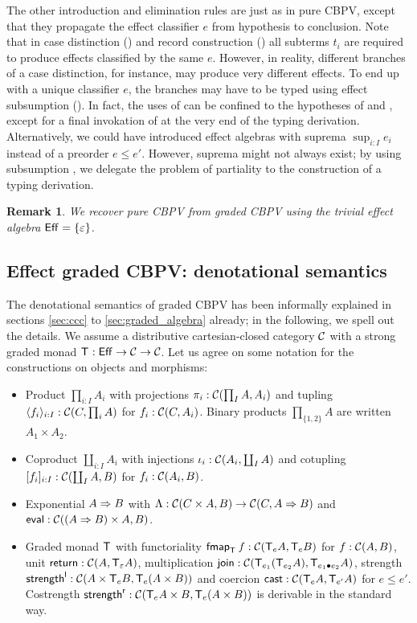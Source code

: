 \documentclass[acmsmall,review,anonymous]{acmart}\settopmatter{printfolios=true,printccs=false,printacmref=false}
\newtheorem{remark}{Remark}
\begin{document}
The other introduction and elimination rules are just as in pure
CBPV, except that they propagate the effect classifier $e$ from
hypothesis to conclusion.  Note that in case distinction (\relim\GS)
and record construction (\rintro\Pi) all subterms $t_i$ are required
to produce effects classified by the same $e$.  However, in reality,
different branches of a case distinction, for instance, may produce
very different effects.  To end up with a unique classifier $e$, the
branches may have to be typed using effect subsumption (\rsub).  In
fact, the uses of \rsub can be confined to the hypotheses of \relim\GS
and \rintro\Pi, except for a final invokation of \rsub at the very end
of the typing derivation.  Alternatively, we could have introduced
effect algebras with suprema $\sup_{i:I} e_i$ instead of a preorder $e
\leq e'$.  However, suprema might not always exist; by using
subsumption \rsub, we delegate the problem of partiality to the
construction of a typing derivation.

\begin{remark}\label{rem:cbpv}
  We recover pure CBPV from graded CBPV using the trivial effect
  algebra $\Eff = \{\Ge\}$.
\end{remark}

\subsection{Effect graded CBPV: denotational semantics}

The denotational semantics of graded CBPV has been informally explained in
sections \ref{sec:ccc} to \ref{sec:graded_algebra} already; in the following,
we spell out the details.  We assume a distributive cartesian-closed
category $\CC$ with a strong graded monad $\T : \Eff \to \CC \to \CC$.
Let us agree on some notation for the constructions on objects and
morphisms:
\begin{itemize}
\item Product $\prod_{i:I} A_i$ with projections $\pi_i : \CC(\prod_I
  A, A_i)$ and tupling $\langle f_i
  \rangle_{i:I} : \CC(C,\prod_i A)$ for $f_i : \CC(C,A_i)$.  Binary
  products $\prod_{\{1,2\}} A$ are written $A_1 \times A_2$.
\item Coproduct $\coprod_{i:I} A_i$ with injections $\iota_i :
  \CC(A_i,\coprod_I A)$ and cotupling $[f_i]_{i:I} : \CC(\coprod_I A,
  B)$ for $f_i : \CC(A_i,B)$.
\item Exponential $A \To B$ with $\Lambda : \CC(C \times A, B) \to
  \CC(C, A \To B)$ and $\teval : \CC((A \To B) \times A, B)$.
\item Graded monad $\T$ with functoriality $\fmap[\T] f :
  \CC(\T[e]A,\T[e]B)$ for $f : \CC(A,B)$,
  unit $\treturn : \CC(A,\T[\Ge]A)$,
  multiplication $\tjoin : \CC(\T[e_1](\T[e_2]A),\T[e_1 \bu e_2]A)$,
  strength $\strengthl : \CC(A \times \T[e]B, \T[e](A \times B))$ and
  coercion $\tcast : \CC(\T[e]A,\T[e']A)$ for $e \leq e'$.
  Costrength $\strengthr : \CC(\T[e]A \times B, \T[e](A \times B))$
  is derivable in the standard way.
\end{itemize}
\end{document}
